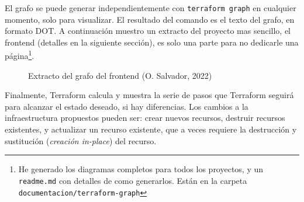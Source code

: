 \documentclass[11pt]{article}
\begin{document}
\begin{flushleft}
		El grafo se puede generar independientemente con \texttt{terraform graph} en cualquier momento, solo para visualizar. El resultado del comando es el texto del grafo, en formato DOT. A continuación muestro un extracto del proyecto mas sencillo, el frontend (detalles en la siguiente sección), es solo una parte para no dedicarle una página\footnote{He generado los diagramas completos para todos los proyectos, y un \texttt{readme.md} con detalles de como generarlos. Están en la carpeta \texttt{documentacion/terraform-graph}}. 
		\linebreak
		
		\medskip
		
		\begin{figure}[htb]
			\centering
			\caption{Extracto del grafo del frontend (O. Salvador, 2022)}
		\end{figure}
		
		\clearpage
		
		Finalmente, Terraform calcula y muestra la serie de pasos que Terraform seguirá para alcanzar el estado deseado, si hay diferencias. Los cambios a la infraestructura propuestos pueden ser: crear nuevos recursos, destruir recursos existentes, y actualizar un recurso existente, que a veces requiere la destrucción y sustitución (\textit{creación in-place}) del recurso.
		\linebreak
		

\end{flushleft}
\end{document}
